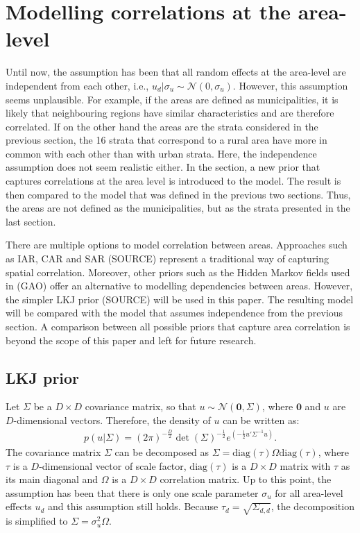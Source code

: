 \section{Modelling correlations at the area-level}

Until now, the assumption has been that all random effects at the area-level are independent from each other, i.e., $u_d|\sigma_u \sim \mathcal N (0, \sigma_u)$.
However, this assumption seems unplausible.
For example, if the areas are defined as municipalities, it is likely that neighbouring regions have similar characteristics and are therefore correlated.
If on the other hand the areas are the strata considered in the previous section, the 16 strata that correspond to a rural area have more in common with each other than with urban strata.
Here, the independence assumption does not seem realistic either.
In the section, a new prior that captures correlations at the area level is introduced to the model.
The result is then compared to the model that was defined in the previous two sections.
Thus, the areas are not defined as the municipalities, but as the strata presented in the last section.

There are multiple options to model correlation between areas.
Approaches such as IAR, CAR and SAR (SOURCE) represent a traditional way of capturing spatial correlation. Moreover, other priors such as the Hidden Markov fields used in (GAO) offer an alternative to modelling dependencies between areas.
However, the simpler LKJ prior (SOURCE) will be used in this paper.
The resulting model will be compared with the model that assumes independence from the previous section.
A comparison between all possible priors that capture area correlation is beyond the scope of this paper and left for future research.

\subsection{LKJ prior}

Let $\Sigma$ be a $D \times D$ covariance matrix, so that $u \sim \mathcal{N}(\boldsymbol{0}, \Sigma)$, where $\boldsymbol 0$ and $u$ are $D$-dimensional vectors.
Therefore, the density of $u$ can be written as:
\begin{gather*}
    p(u|\Sigma) = (2\pi)^{-\frac D 2}\det(\Sigma)^{-\frac 1 2} e^{(-\frac 1 2 u'\Sigma^{-1} u)}.
\end{gather*}
The covariance matrix $\Sigma$ can be decomposed as $\Sigma = \text{diag}(\tau)\Omega\text{diag}(\tau)$, where $\tau$ is a $D$-dimensional vector of scale factor, $\text{diag}(\tau)$ is a $D \times D$ matrix with $\tau$ as its main diagonal and $\Omega$ is a $D \times D$ correlation matrix.
Up to this point, the assumption has been that there is only one scale parameter $\sigma_u$ for all area-level effects $u_d$ and this assumption still holds.
Because $\tau_d = \sqrt{\Sigma_{d, d}}$, the decomposition is simplified to $\Sigma = \sigma_u^2 \Omega$.

